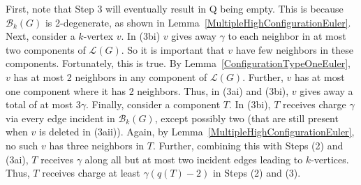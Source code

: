 \documentclass[12pt]{article}
\theoremstyle{plain}
\theoremstyle{definition}
\theoremstyle{remark}
\newcommand{\fancy}[1]{\mathcal{#1}}
\newcommand{\T}{\fancy{T}}
\newcommand{\B}{\fancy{B}}
\renewcommand{\L}{\fancy{L}}
\newcommand{\HH}{\fancy{H}}
\newcommand{\ch}{\operatorname{ch}}
\begin{document}
First, note that Step 3 will eventually result in Q being empty.  This is because $\B_k(G)$ is 2-degenerate, as shown in 
Lemma~\ref{MultipleHighConfigurationEuler}.  Next, consider a $k$-vertex $v$.  In (3bi) $v$ gives away $\gamma$ to each neighbor in 
at most two components of $\L(G)$.  So it is important that $v$ have few neighbors in these components.  Fortunately, this is true.
By Lemma~\ref{ConfigurationTypeOneEuler}, $v$ has at most 2 neighbors in any component of $\L(G)$.  Further, $v$ has at most one component where it has 2 neighbors.  Thus, in (3ai) and (3bi), $v$ gives away a total of at most $3\gamma$.  Finally, consider a component $T$.  In (3bi), $T$ receives charge $\gamma$ via every edge incident in $\B_k(G)$, except possibly two (that are still present when $v$ is deleted in (3aii)).  Again, by Lemma~\ref{MultipleHighConfigurationEuler}, no such $v$ has three neighbors in $T$.  Further, combining this with Steps (2) and (3ai), $T$ receives $\gamma$ along all but at most two incident edges leading to $k$-vertices.  Thus, $T$ receives charge at least $\gamma(q(T)-2)$ in Steps (2) and (3).


\end{document}
